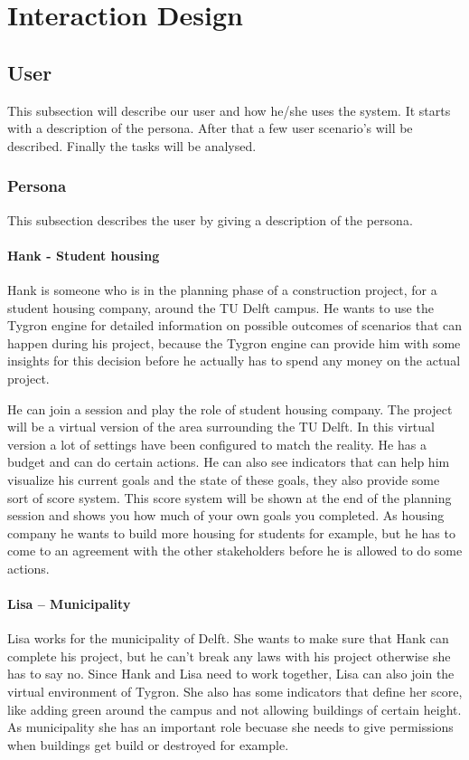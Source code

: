 \chapter{Interaction Design}\label{ch:IxD}
\section{User}
This subsection will describe our user and how he/she uses the system. 
It starts with a description of the persona. 
After that a few user scenario's will be described.
Finally the tasks will be analysed.

\subsection{Persona}
This subsection describes the user by giving a description of the persona.
\subsubsection*{Hank - Student housing}
Hank is someone who is in the planning phase of a construction project, for a student housing company, around the TU Delft campus. He wants to use the Tygron engine for detailed information on possible outcomes of scenarios that can happen during his project, because the Tygron engine can provide him with some insights for this decision before he actually has to spend any money on the actual project. 

He can join a session and play the role of student housing company. The project will be a virtual version of the area surrounding the TU Delft. In this virtual version a lot of settings have been configured to match the reality. He has a budget and can do certain actions. He can also see indicators that can help him visualize his current goals and the state of these goals, they also provide some sort of score system. This score system will be shown at the end of the planning session and shows you how much of your own goals you completed. As housing company he wants to build more housing for students for example, but he has to come to an agreement with the other stakeholders before he is allowed to do some actions.

\subsubsection*{Lisa – Municipality}
Lisa works for the municipality of Delft. She wants to make sure that Hank can complete his project, but he can’t break any laws with his project otherwise she has to say no. Since Hank and Lisa need to work together, Lisa can also join the virtual environment of Tygron. She also has some indicators that define her score, like adding green around the campus and not allowing buildings of certain height. As municipality she has an important role becuase she needs to give permissions when buildings get build or destroyed for example.

